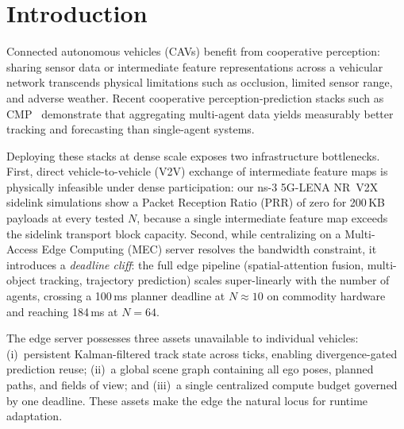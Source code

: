 \section{Introduction}

Connected autonomous vehicles (CAVs) benefit from cooperative perception:
sharing sensor data or intermediate feature representations across a
vehicular network transcends physical limitations such as occlusion,
limited sensor range, and adverse weather.  Recent cooperative
perception-prediction stacks such as CMP~\cite{cmp2024,cmp_ieee_2023} demonstrate that
aggregating multi-agent data yields measurably better tracking and
forecasting than single-agent systems.

Deploying these stacks at dense scale exposes two infrastructure
bottlenecks.  First, direct vehicle-to-vehicle (V2V) exchange of
intermediate feature maps is physically infeasible under dense
participation: our ns-3 5G-LENA NR~V2X sidelink simulations show a
Packet Reception Ratio (PRR) of zero for 200\,KB payloads at every
tested $N$, because a single intermediate feature map exceeds the
sidelink transport block capacity.  Second, while centralizing on a
Multi-Access Edge Computing (MEC) server resolves the bandwidth
constraint, it introduces a \emph{deadline cliff}: the full edge
pipeline (spatial-attention fusion, multi-object tracking, trajectory
prediction) scales super-linearly with the number of agents, crossing
a 100\,ms planner deadline at $N \approx 10$ on commodity hardware and
reaching 184\,ms at $N=64$.

The edge server possesses three assets unavailable to individual
vehicles: (i)~persistent Kalman-filtered track state across ticks,
enabling divergence-gated prediction reuse; (ii)~a global scene graph
containing all ego poses, planned paths, and fields of view; and
(iii)~a single centralized compute budget governed by one deadline.
These assets make the edge the natural locus for runtime adaptation.

